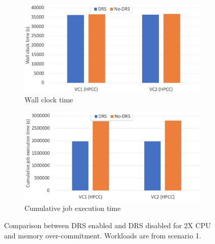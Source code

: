 \begin{figure}
     \centering
     \begin{subfigure}[b]{0.48\textwidth}
         \centering
         \includegraphics[width=\textwidth]{Figures/memory_wct_1.pdf}
         \caption{Wall clock time}
         \label{fig:memory_wct_1}
     \end{subfigure}
     \hfill
     \begin{subfigure}[b]{0.48\textwidth}
         \centering
         \includegraphics[width=\textwidth]{Figures/memory_cjet_1.pdf}
         \caption{Cumulative job execution time}
         \label{fig:memory_cjet_1}
     \end{subfigure}
     \caption{Comparison between DRS enabled and DRS disabled for 2X CPU and memory over-commitment. Workloads are from scenario 1. }
     \label{fig:memory_scenario_1}
\end{figure}

